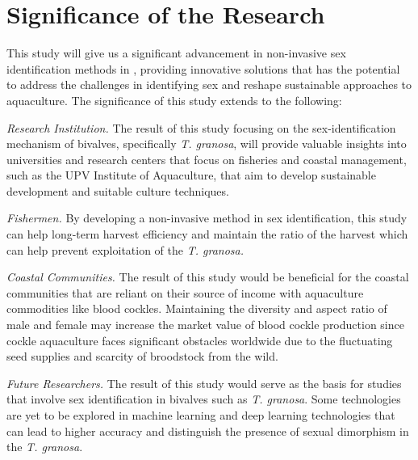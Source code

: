 \section{Significance of the Research}
\label{sec:significance}

This study will give us a significant advancement in non-invasive sex identification methods in \Tegillarcagranosa, providing innovative solutions that has the potential to address the challenges in identifying sex and reshape sustainable approaches to aquaculture. The significance of this study extends to the following:

\textit{Research Institution.} The result of this study focusing on the sex-identification mechanism of bivalves, specifically \textit{T. granosa}, will provide valuable insights into universities and research centers that focus on fisheries and coastal management, such as the UPV Institute of Aquaculture, that aim to develop sustainable development and suitable culture techniques.

\textit{Fishermen.} By developing a non-invasive method in sex identification, this study can help long-term harvest efficiency and maintain the ratio of the harvest which can help prevent exploitation of the \textit{T. granosa.}

\textit{Coastal Communities.} The result of this study would be beneficial for the coastal communities that are reliant on their source of income with aquaculture commodities like blood cockles. Maintaining the diversity and aspect ratio of male and female may increase the market value of blood cockle production since cockle aquaculture faces significant obstacles worldwide due to the fluctuating seed supplies and scarcity of broodstock from the wild. 

\textit{Future Researchers.} The result of this study would serve as the basis for studies that involve sex identification in bivalves such as \textit{T. granosa}. Some technologies are yet to be explored in machine learning and deep learning technologies that can lead to higher accuracy and distinguish the presence of sexual dimorphism in the \textit{T. granosa}.


